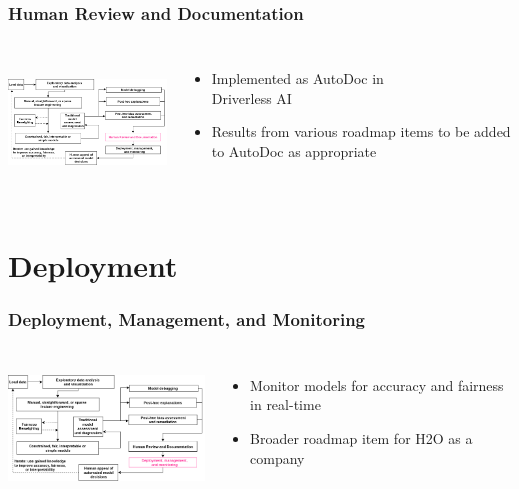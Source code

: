 \documentclass[11pt,
               aspectratio=169,
               hyperref={colorlinks}
               ]{beamer}
\begin{document}
		\begin{frame}
		
			\frametitle{Human Review and Documentation}		
			
			\begin{columns}
	
				\centering
				\includegraphics[height=100pt]{img/hr.png}
				
				\vspace{-5pt}
				\begin{itemize}
					\item Implemented as AutoDoc in\\ Driverless AI 
					\item Results from various roadmap items to be added to AutoDoc as appropriate
				\end{itemize}
				
			\end{columns}
		
		\end{frame}

	\section{Deployment}

		\begin{frame}

			\frametitle{Deployment, Management, and Monitoring}		
			
			\begin{columns}
	
				\column{0.4\linewidth}
				\centering
				\includegraphics[height=100pt]{img/deploy.png}
				
				\column{0.5\linewidth}
				\vspace{-5pt}
				\begin{itemize}
					\item Monitor models for accuracy and fairness in real-time
					\item Broader roadmap item for H2O as a company
				\end{itemize}
				
			\end{columns}
		
		\end{frame}
\end{document}
